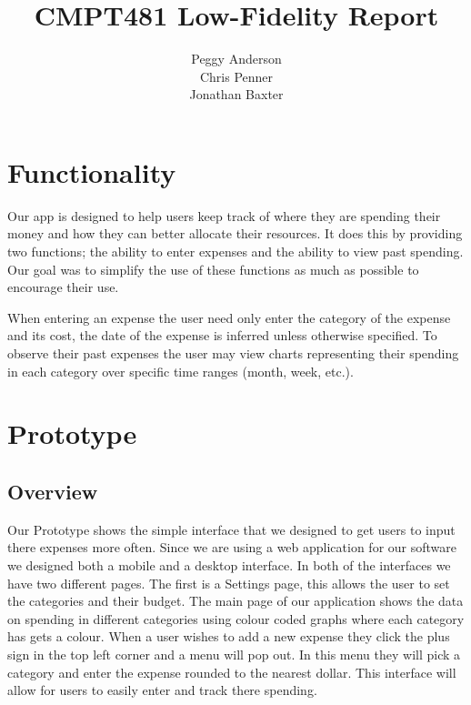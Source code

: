 \documentclass{chi2011}
\begin{document}
\setlength{\paperheight}{11in}
\setlength{\paperwidth}{8.5in}
\setlength{\pdfpageheight}{\paperheight}
\setlength{\pdfpagewidth}{\paperwidth}


\title{CMPT481 Low-Fidelity Report}
\author{
\alignauthor Peggy Anderson\\
    \alignauthor Chris Penner\\
    \alignauthor Jonathan Baxter\\
}


\maketitle

\section{Functionality}

Our app is designed to help users keep track of where they are spending their money and how they can better allocate
their resources. It does this by providing two functions; the ability to enter expenses and the ability to view past
spending. Our goal was to simplify the use of these functions as much as possible to encourage their use.

When entering an expense the user need only enter the category of the expense and its cost, the date of the expense is
inferred unless otherwise specified. To observe their past expenses the user may view charts representing their
spending in each category over specific time ranges (month, week, etc.).


\section{Prototype}
    \subsection{Overview}
	Our Prototype shows the simple interface that we designed to get users to
	input there expenses more often. Since we are using a web application for
	our software we designed both a mobile and a desktop interface. In both of
	the interfaces we have two different pages. The first is a Settings page,
	this allows the user to set the categories and their budget. The main page
	of our application shows the data on spending in different categories using
	colour coded graphs where each category has gets a colour. When a user
	wishes to add a new expense they click the plus sign in the top left corner
	and a menu will pop out. In this menu they will pick a category and enter
	the expense rounded to the nearest dollar. This interface will allow for
	users to easily enter and track there spending.
\end{document}
